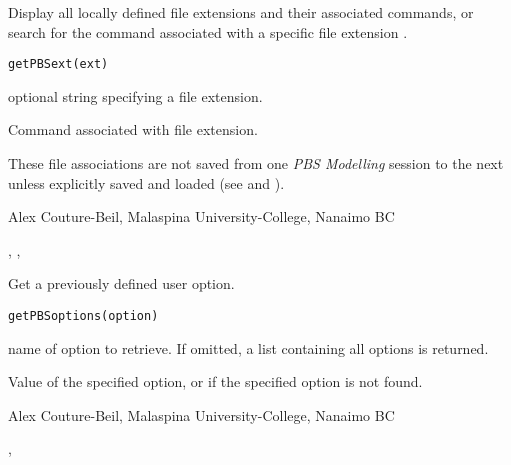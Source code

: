 \documentclass[letterpaper]{book}
\begin{document}
\begin{Description}\relax
Display all locally defined file extensions and their associated commands, 
or search for the command associated with a specific file extension
.
\end{Description}
\begin{Usage}
\begin{verbatim}getPBSext(ext)\end{verbatim}
\end{Usage}
\begin{Arguments}
\begin{ldescription}
\item[\code{ext}] optional string specifying a file extension.
\end{ldescription}
\end{Arguments}
\begin{Value}
Command associated with file extension.
\end{Value}
\begin{Note}\relax
These file associations are not saved from one \emph{PBS Modelling} session to
the next unless explicitly saved and loaded (see  and
).
\end{Note}
\begin{Author}\relax
Alex Couture-Beil, Malaspina University-College, Nanaimo BC
\end{Author}
\begin{SeeAlso}\relax
{}, , 
\end{SeeAlso}

\begin{Description}\relax
Get a previously defined user option.
\end{Description}
\begin{Usage}
\begin{verbatim}
getPBSoptions(option)
\end{verbatim}
\end{Usage}
\begin{Arguments}
\begin{ldescription}
\item[\code{option}] name of option to retrieve. If omitted, a list containing all options is returned.
\end{ldescription}
\end{Arguments}
\begin{Value}
Value of the specified option, or  if the specified option is not found.
\end{Value}
\begin{Author}\relax
Alex Couture-Beil, Malaspina University-College, Nanaimo BC
\end{Author}
\begin{SeeAlso}\relax
{}, 
\end{SeeAlso}
\end{document}
